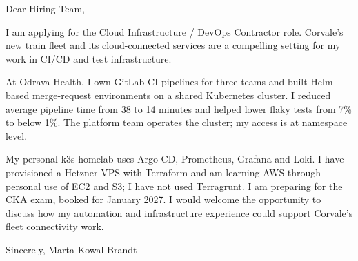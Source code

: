 \documentclass[11pt,a4paper]{article}
\begin{document}
Dear Hiring Team,

I am applying for the Cloud Infrastructure / DevOps Contractor role. Corvale’s new train fleet and its cloud-connected services are a compelling setting for my work in CI/CD and test infrastructure.

At Odrava Health, I own GitLab CI pipelines for three teams and built Helm-based merge-request environments on a shared Kubernetes cluster. I reduced average pipeline time from 38 to 14 minutes and helped lower flaky tests from 7\% to below 1\%. The platform team operates the cluster; my access is at namespace level.

My personal k3s homelab uses Argo CD, Prometheus, Grafana and Loki. I have provisioned a Hetzner VPS with Terraform and am learning AWS through personal use of EC2 and S3; I have not used Terragrunt. I am preparing for the CKA exam, booked for January 2027. I would welcome the opportunity to discuss how my automation and infrastructure experience could support Corvale’s fleet connectivity work.

Sincerely,
Marta Kowal-Brandt
\end{document}

